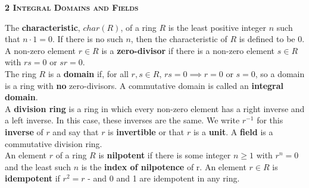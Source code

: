 \documentclass[a4paper]{article}
\begin{document}
\begin{framed}
	\begin{center}
		\textbf{\textsc{2 Integral Domains and Fields}}
	\end{center}
	The \textbf{characteristic}, $char(R)$, of a ring $R$ is the least positive integer $n$ such that $n \cdot 1 = 0$. If there is no such $n$, then the characteristic of $R$ is defined to be 0.\\
	
	\noindent
	A non-zero element $r \in R$ is a \textbf{zero-divisor} if there is a non-zero element $s \in R$ with $rs = 0$ or $sr = 0$.\\
	
	\noindent
	The ring $R$ is a \textbf{domain} if, for all $r, s \in R$, $rs = 0 \implies r = 0$ or $s = 0$, so a domain is a ring with \textbf{no} zero-divisors. A commutative domain is called an \textbf{integral domain}.\\
	
	\noindent
	A \textbf{division ring} is a ring in which every non-zero element has a right inverse and a left inverse. In this case, these inverses are the same. We write $r^{-1}$ for this \textbf{inverse} of $r$ and say that $r$ is \textbf{invertible} or that $r$ is a \textbf{unit}. A \textbf{field} is a commutative division ring.\\
	
	\noindent
	An element $r$ of a ring $R$ is \textbf{nilpotent} if there is some integer $n \geq 1$ with $r^n = 0$ and the least such $n$ is the \textbf{index of nilpotence} of r. An element $r \in R$ is \textbf{idempotent} if $r^2 = r$ - and 0 and 1 are idempotent in any ring.
\end{framed}
\end{document}
